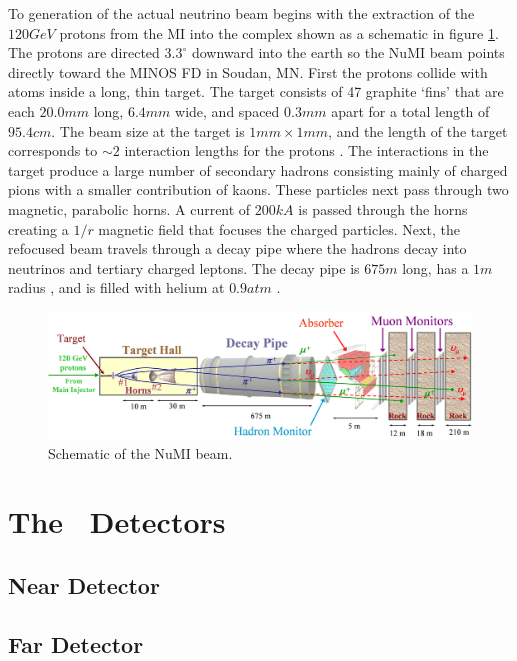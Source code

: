To generation of the actual neutrino beam begins with the extraction of the $120\unit{GeV}$ protons from the MI into the complex shown as a schematic in figure \ref{fig:FNAL_NuMI}. The protons are directed $3.3^\circ$ downward into the earth so the NuMI beam points directly toward the MINOS FD in Soudan, MN. First the protons collide with atoms inside a long, thin target. The target consists of 47 graphite `fins' that are each $20.0\unit{mm}$ long, $6.4\unit{mm}$ wide, and spaced $0.3\unit{mm}$ apart for a total length of $95.4\unit{cm}$. The beam size at the target is $1\unit{mm} \times 1\unit{mm}$, and the length of the target corresponds to ${\sim}2$ interaction lengths for the protons \cite{ref:TDRNuMI}. The interactions in the target produce a large number of secondary hadrons consisting mainly of charged pions with a smaller contribution of kaons. These particles next pass through two magnetic, parabolic horns. A current of $200\unit{kA}$ is passed through the horns creating a $1/r$ magnetic field that focuses the charged particles. Next, the refocused beam travels through a decay pipe where the hadrons decay into neutrinos and tertiary charged leptons. The decay pipe is $675\unit{m}$ long, has a $1\unit{m}$ radius \cite{ref:TDRNOvA}, and is filled with helium at $0.9\unit{atm}$ \cite{ref:Helium}.
\begin{figure}[htb]
  \centering
  \includegraphics[width=1\textwidth]{figures/FNAL_NuMI.png}
  \caption[NuMI Beam Schematic]{Schematic of the NuMI beam.}
  \label{fig:FNAL_NuMI}
\end{figure}



\section{The \nova~Detectors}

\subsection{Near Detector}

\subsection{Far Detector}